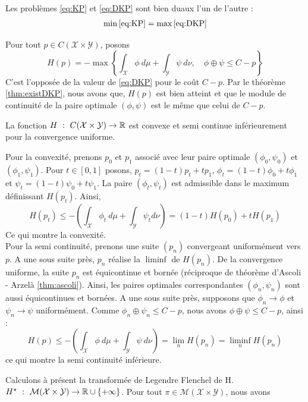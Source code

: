 \documentclass[a4paper,12pt]{article}
\begin{document}
\begin{theoreme}{}
\label{thm:dualite}
Les problèmes \eqref{eq:KP} et \eqref{eq:DKP} sont bien duaux l'un de l'autre :
\begin{align}
\min\eqref{eq:KP} = \max\eqref{eq:DKP}
\end{align}
\end{theoreme}
\begin{preuve}
Pour tout $p\in C(\mathcal{X}\times\mathcal{Y})$, posons 
$$
H(p) = -\max\left\{\int_{\mathcal{X}} \phi\ d\mu +\int_{\mathcal{Y}} \psi\ d\nu, \quad \phi\oplus\psi\leq C-p\right\}
$$
C'est l'opposée de la valeur de \eqref{eq:DKP} pour le coût $C-p$. Par le théorème \ref{thm:existDKP}, nous avons que, $H(p)$ est bien atteint et que le module de continuité de la paire optimale $(\phi,\psi)$ est le même que celui de $C-p$. 
\begin{lemme}
La fonction $H\ :\ C(\mathcal{X}\times\mathcal{Y})\rightarrow\RR$ est convexe et semi continue inférieurement pour la convergence uniforme.
\end{lemme}
\begin{preuve}
Pour la convexité, prenons $p_0$ et $p_1$ associé avec leur paire optimale $(\phi_0,\psi_0)$ et $(\phi_1,\psi_1)$. Pour $t\in [0,1]$ posons, $p_t=(1-t)p_t+tp_1$, $\phi_t=(1-t)\phi_0 + t\phi_1$ et $\psi_t=(1-t)\psi_0+t\psi_1$. La paire $(\phi_t,\psi_t)$ est admissible dans le maximum définissant $H(p_t)$. Ainsi, 
$$
H(p_t)\leq-\left(\int_{\mathcal{X}}\phi_t\ d\mu+\int_{\mathcal{Y}}\psi_t d\nu\right) = (1-t)H(p_0)+tH(p_1)
$$
Ce qui montre la convexité.\\
Pour la semi continuité, prenons une suite $(p_n)$ convergeant uniformément vers $p$. A une sous suite près, $p_n$ réalise la $\liminf$ de $H(p_n)$. De la convergence uniforme, la suite $p_n$ est équicontinue et bornée (réciproque de théorème d'Ascoli - Arzelà \eqref{thm:ascoli}). Ainsi, les paires optimales correspondantes $(\phi_n,\psi_n)$ sont aussi équicontinues et bornées. A une sous suite près, supposons que $\phi_n\rightarrow\phi$ et $\psi_n\rightarrow\psi$ uniformément. Comme $\phi_n\oplus\psi_n\leq C-p$, nous avons $\phi\oplus\psi\leq C-p$, ainsi :
$$
H(p) \leq - \left(\int_{\mathcal{X}}\phi\ d\mu+\int_{\mathcal{Y}}\psi\ d\nu\right) = \lim_n H(p_n)=\liminf_n H(p_n)
$$
ce qui montre la semi continuité inférieure.
\end{preuve}
Calculons à présent la transformée de Legendre Flenchel de H.\\
$H^{\star}\ :\ \mathcal{M}(\mathcal{X}\times\mathcal{Y})\rightarrow\RR\cup\{+\infty\}$. Pour tout $\pi\in\mathcal{M}(\mathcal{X}\times\mathcal{Y})$, nous avons 

\end{preuve}
\end{document}
